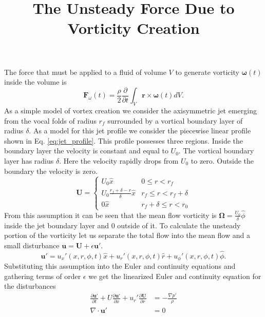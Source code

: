 \documentclass[superscriptaddress, onecolumn, prl]{revtex4}
\begin{document}
\title{The Unsteady Force Due to Vorticity Creation}
\maketitle
The force that must be applied to a fluid of volume $V$ to generate vorticity $\boldsymbol{\omega}(t)$ inside the volume is 
\begin{equation}
\textbf{F}_{\omega}(t) = \frac{\rho}{2} \frac{\partial}{\partial t} \int_V \textbf{r} \times \boldsymbol{\omega}(t) dV.
\end{equation}
As a simple model of vortex creation we consider the axisymmetric jet emerging from the vocal folds of radius $r_f$ surrounded by a vortical boundary layer of radius $\delta$. As a model for this jet profile we consider the piecewise linear profile shown in Eq. \ref{eq:jet_profile}. This profile possesses three regions. Inside the boundary layer the velocity is constant and equal to $U_0$. The vortical boundary layer has radius $\delta$. Here the velocity rapidly drops from $U_0$ to zero. Outside the boundary the velocity is zero.
\begin{equation}
\label{eq:jet_profile}
\textbf{U} = 
\begin{cases}
U_0 \hat{x} & 0 \leq r < r_f \\
U_0\frac{r_f + \delta - r}{\delta}\hat{x} & r_f \leq r < r_f + \delta \\
0 \hat{x} & r_f + \delta \leq r < r_0
\end{cases}
\end{equation}
From this assumption it can be seen that the mean flow vorticity is $\boldsymbol{\Omega} = \frac{U_0}{\delta} \hat{\phi}$ inside the jet boundary layer and $0$ outside of it. To calculate the unsteady portion of the vorticity let us separate the total flow into the mean flow and a small disturbance $\textbf{u} = \textbf{U} + \epsilon \textbf{u}'$.
\begin{equation}
\textbf{u}' = u_x'(x, r, \phi, t) \hat{x} + u_r'(x, r, \phi, t)  \hat{r} + u_\phi'(x, r, \phi, t)  \hat{\phi}.
\end{equation}
Substituting this assumption into the Euler and continuity equations and gathering terms of order $\epsilon$ we get the linearized Euler and continuity equation for the disturbances
\begin{equation}
\begin{split}
\label{eq:linear_disturbance}
\frac{\partial \textbf{u}' }{\partial t} + U \frac{\partial \textbf{u}'}{\partial x} + u_r' \frac{\partial \textbf{U}}{\partial r} &= -\frac{\nabla p'}{\rho} \\
\nabla \cdot \textbf{u}' &= 0 
\end{split}
\end{equation}
\end{document}
